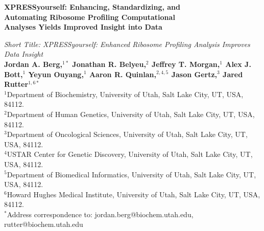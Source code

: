 \documentclass[10pt, oneside]{article}
\date{}
\begin{document}
\baselineskip24pt

\noindent
{\huge
\textbf{XPRESSyourself: Enhancing, Standardizing, and \\
Automating Ribosome Profiling Computational \\
Analyses Yields Improved Insight into Data
}
}

\bigskip

\noindent
{\large
\textit{Short Title: XPRESSyourself: Enhanced Ribosome Profiling Analysis Improves Data Insight}
} \\



\noindent
{\large
\textbf{Jordan A. Berg,$^{1\ast}$ Jonathan R. Belyeu,$^{2}$ Jeffrey T. Morgan,$^{1}$ Alex J. Bott,$^{1}$ Yeyun Ouyang,$^{1}$ Aaron R. Quinlan,$^{2,4,5}$ Jason Gertz,$^{3}$ Jared Rutter$^{1,6\ast}$
}
} \\

\noindent
{$^{1}$Department of Biochemistry, University of Utah, Salt Lake City, UT, USA, 84112.}\\
{$^{2}$Department of Human Genetics, University of Utah, Salt Lake City, UT, USA, 84112.}\\
{$^{3}$Department of Oncological Sciences, University of Utah, Salt Lake City, UT, USA, 84112.}\\
{$^{4}$USTAR Center for Genetic Discovery, University of Utah, Salt Lake City, UT, USA, 84112.}\\
{$^{5}$Department of Biomedical Informatics, University of Utah, Salt Lake City, UT, USA, 84112.}\\
{$^{6}$Howard Hughes Medical Institute, University of Utah, Salt Lake City, UT, USA, 84112.}\\
{$^\ast$Address correspondence to: jordan.berg@biochem.utah.edu, rutter@biochem.utah.edu}

\pagebreak

\end{document}
